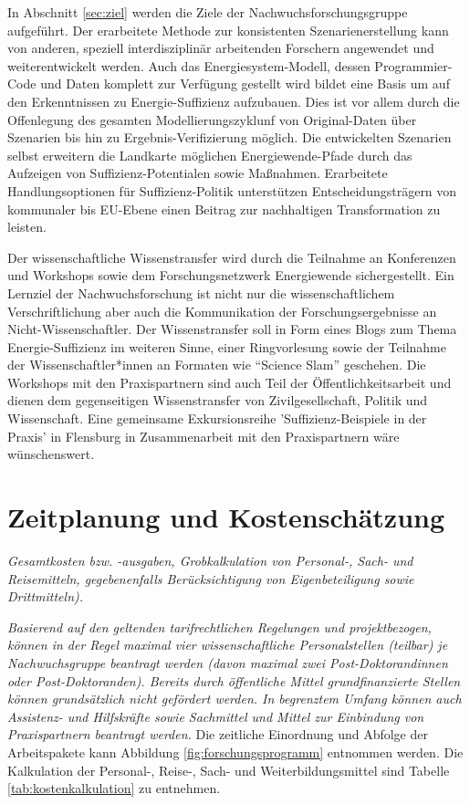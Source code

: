 \documentclass[a4paper,11pt,twoside]{scrartcl}
\begin{document}

In Abschnitt \ref{sec:ziel} werden die Ziele der Nachwuchsforschungsgruppe aufgeführt. Der erarbeitete Methode zur konsistenten Szenarienerstellung kann von anderen, speziell interdisziplinär arbeitenden Forschern angewendet und weiterentwickelt werden. Auch das Energiesystem-Modell, dessen Programmier-Code und Daten komplett zur Verfügung gestellt wird bildet eine Basis um auf den Erkenntnissen zu Energie-Suffizienz aufzubauen. Dies ist vor allem durch die Offenlegung des gesamten Modellierungszyklunf von Original-Daten über Szenarien bis hin zu Ergebnis-Verifizierung möglich. Die entwickelten Szenarien selbst erweitern die Landkarte  möglichen Energiewende-Pfade durch das Aufzeigen von Suffizienz-Potentialen sowie Maßnahmen. Erarbeitete Handlungsoptionen für Suffizienz-Politik unterstützen Entscheidungsträgern von kommunaler bis EU-Ebene einen Beitrag zur nachhaltigen Transformation zu leisten.

Der wissenschaftliche Wissenstransfer wird durch die Teilnahme an Konferenzen und Workshops sowie dem Forschungsnetzwerk Energiewende sichergestellt. 
Ein Lernziel der Nachwuchsforschung ist nicht nur die wissenschaftlichem Verschriftlichung aber auch die Kommunikation der Forschungsergebnisse an Nicht-Wissenschaftler. Der Wissenstransfer soll in Form eines Blogs zum Thema Energie-Suffizienz im weiteren Sinne, einer Ringvorlesung sowie der Teilnahme der Wissenschaftler*innen an Formaten wie ``Science Slam'' geschehen. Die Workshops mit den Praxispartnern sind auch Teil der Öffentlichkeitsarbeit und dienen dem gegenseitigen Wissenstransfer von Zivilgesellschaft, Politik und Wissenschaft. Eine gemeinsame Exkursionsreihe 'Suffizienz-Beispiele in der Praxis' in Flensburg in Zusammenarbeit mit den Praxispartnern wäre wünschenswert.

\section{Zeitplanung und Kostenschätzung}
\textit{Gesamtkosten bzw. -ausgaben, Grobkalkulation von Personal-, Sach- und Reisemitteln, gegebenenfalls Berücksichtigung von Eigenbeteiligung sowie Drittmitteln).}

\textit{Basierend auf den geltenden tarifrechtlichen Regelungen und projektbezogen, können in der Regel maximal vier wissenschaftliche Personalstellen (teilbar) je Nachwuchsgruppe beantragt werden (davon maximal zwei Post-Doktorandinnen oder Post-Doktoranden). Bereits durch öffentliche Mittel grundfinanzierte Stellen können grundsätzlich nicht gefördert werden.
In begrenztem Umfang können auch Assistenz- und Hilfskräfte sowie Sachmittel und Mittel zur Einbindung von Praxispartnern beantragt werden.}
Die zeitliche Einordnung und Abfolge der Arbeitspakete kann Abbildung \ref{fig:forschungsprogramm} entnommen werden. Die Kalkulation der Personal-, Reise-, Sach- und Weiterbildungsmittel sind Tabelle \ref{tab:kostenkalkulation} zu entnehmen.
\end{document}
